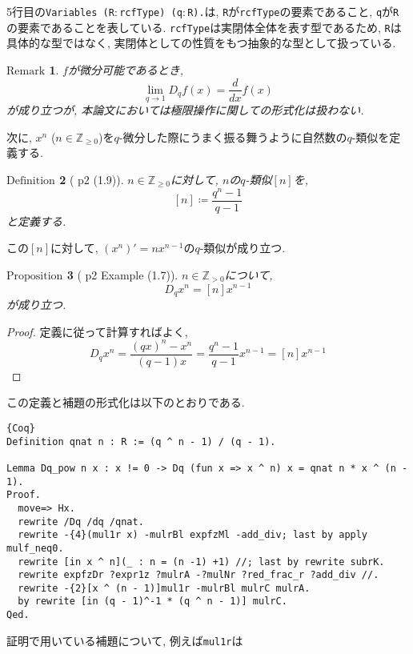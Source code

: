 \documentclass[11pt]{jsreport}
\theoremstyle{mystyle}
\newtheorem{df}{$\textrm{Definition}$}[subsection]
\newtheorem{prop}[df]{$\textrm{Proposition}$}
\newtheorem{rmk}[df]{$\textrm{Remark}$}
\newcommand{\bdf}{\begin{shadebox} \begin{df}}
\newcommand{\edf}{\end{df} \end{shadebox}}
\newcommand{\bprop}{\begin{shadebox} \begin{prop}}
\newcommand{\eprop}{\end{prop} \end{shadebox}}
\newcommand{\brmk}{\begin{rmk}}
\newcommand{\ermk}{\end{rmk}}
\newcommand{\bpf}{\begin{proof}}
\newcommand{\epf}{\end{proof}}
\newcommand{\ra}{\rightarrow}
\newcommand{\Z}{\mathbb{Z}}
\newcommand{\0}{\textbf{0}}
\newcommand{\1}{\textbf{1}}
\newcommand{\2}{\textbf{2}}
\begin{document}
5行目の{\tt Variables (R$\colon$rcfType) (q$\colon$R).}は, {\tt R}が{\tt rcfType}の要素であること, {\tt q}が{\tt R}の要素であることを表している. {\tt rcfType}は実閉体全体を表す型であるため, {\tt R}は具体的な型ではなく, 実閉体としての性質をもつ抽象的な型として扱っている. 
\brmk
  $f$が微分可能であるとき, 
  \[
    \lim_{q\ra1} D_qf(x) = \frac{d}{dx}f(x)
  \] 
  が成り立つが, 本論文においては極限操作に関しての形式化は扱わない. 
\ermk
次に, $x ^ n$ ($n \in \Z_{\ge 0}$)を$q$-微分した際にうまく振る舞うように自然数の$q$-類似を定義する. 
\bdf[\cite{Kac} p2 (1.9)]
  $n \in \Z_{\ge 0}$に対して, $n$の$q$-類似$[n]$を, 
  \[
    [n] \coloneqq \frac{q^n - 1}{q - 1}
  \]
  と定義する. 
\edf
この$[n]$に対して, $(x^n)' = n x^{n-1}$の$q$-類似が成り立つ.
\bprop[\cite{Kac} p2 Example (1.7)]
  $n \in \Z_{>0}$について, 
  \[
    D_q x^n = [n] x ^{n - 1}
  \]
  が成り立つ. 
\eprop
\bpf
  定義に従って計算すればよく, 
  \[
    D_q x ^ n = \frac{(qx) ^ n - x ^ n}{(q - 1) x}
                 = \frac{q^n - 1}{q - 1} x ^ {n - 1}
                 = [n] x ^ {n - 1}
  \] 
\epf
この定義と補題の形式化は以下のとおりである. 
\begin{lstlisting}{Coq}
Definition qnat n : R := (q ^ n - 1) / (q - 1).

Lemma Dq_pow n x : x != 0 -> Dq (fun x => x ^ n) x = qnat n * x ^ (n - 1).
Proof.
  move=> Hx.
  rewrite /Dq /dq /qnat.
  rewrite -{4}(mul1r x) -mulrBl expfzMl -add_div; last by apply mulf_neq0.
  rewrite [in x ^ n](_ : n = (n -1) +1) //; last by rewrite subrK.
  rewrite expfzDr ?expr1z ?mulrA -?mulNr ?red_frac_r ?add_div //.
  rewrite -{2}[x ^ (n - 1)]mul1r -mulrBl mulrC mulrA.
  by rewrite [in (q - 1)^-1 * (q ^ n - 1)] mulrC.
Qed.
\end{lstlisting}
証明で用いている補題について, 例えば{\tt mul1r}は
\end{document}
